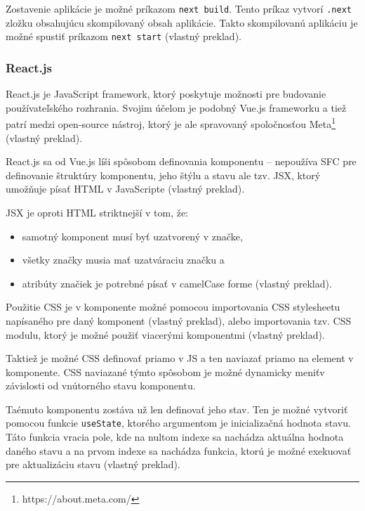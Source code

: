 Zostavenie aplikácie je možné príkazom \texttt{next build}. Tento príkaz vytvorí \texttt{.next} zložku obsahujúcu skompilovaný obsah aplikácie. Takto skompilovanú aplikáciu je možné spustiť príkazom \texttt{next start} \cite{nextjs_introduction} (vlastný preklad). 

\subsubsection {React.js}
React.js je JavaScript framework, ktorý poskytuje možnosti pre budovanie používateľského rozhrania. Svojim účelom je podobný Vue.js frameworku a tiež patrí medzi open-source nástroj, ktorý je ale spravovaný spoločnosťou Meta\footnote{https://about.meta.com/} \cite{about_react} (vlastný preklad).

React.js sa od Vue.js líši spôsobom definovania komponentu -- nepoužíva SFC pre definovanie štruktúry komponentu, jeho štýlu a stavu ale tzv. JSX, ktorý umožňuje písať HTML v JavaScripte \cite{about_react} (vlastný preklad).

JSX je oproti HTML striktnejší v tom, že:
\begin{itemize}
\item {samotný komponent musí byť uzatvorený v značke,}
\item {všetky značky musia mať uzatváraciu značku a}
\item {atribúty značiek je potrebné písať v camelCase forme \cite{jsx_rules} (vlastný preklad).}
\end{itemize}

Použitie CSS je v komponente možné pomocou importovania CSS stylesheetu napísaného pre daný komponent \cite{reactjs_stylesheet} (vlastný preklad), alebo importovania tzv. CSS modulu, ktorý je možné použiť viacerými komponentmi \cite{reactjs_stylesheet_module} (vlastný preklad).

Taktiež je možné CSS definovať priamo v JS a ten naviazať priamo na element v komponente. CSS naviazané týmto spôsobom je možné dynamicky meniť\newline v závislosti od vnútorného stavu komponentu.

Taémuto komponentu zostáva už len definovať jeho stav. Ten je možné vytvoriť pomocou funkcie \texttt{useState}, ktorého argumentom je inicializačná hodnota stavu. Táto funkcia vracia pole, kde na nultom indexe sa nachádza aktuálna hodnota daného stavu a na prvom indexe sa nachádza funkcia, ktorú je možné exekuovať pre aktualizáciu stavu \cite{react_state} (vlastný preklad).

